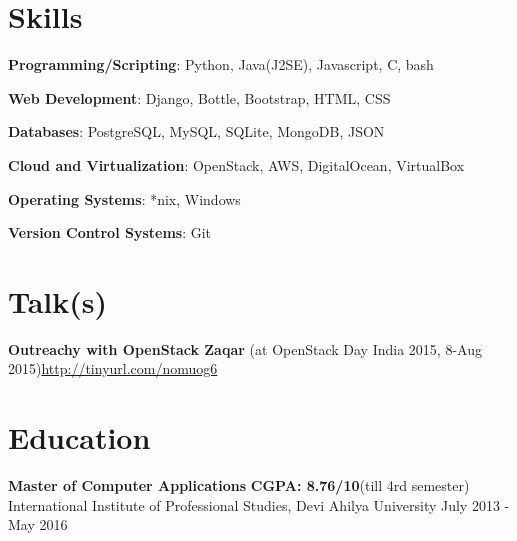 \documentclass[margin,line]{resume}
\begin{document}
\begin{resume}
\begin{list2}
	\end{list2}

    \section{\mysidestyle Skills} 

    \begin{list2}
	\item \textbf{Programming/Scripting}: \hspace{3mm} Python, Java(J2SE), Javascript, C, bash
	\item \textbf{Web Development}: \hspace{13mm}  Django, Bottle, Bootstrap, HTML, CSS
	\item \textbf{Databases}: \hspace{28mm} PostgreSQL, MySQL, SQLite,	MongoDB, JSON
	\item \textbf{Cloud and Virtualization}: \hspace{1mm} OpenStack, AWS, DigitalOcean, VirtualBox
	\item \textbf{Operating Systems}: \hspace{12mm} *nix, Windows
    \item \textbf{Version Control Systems}: \hspace{2mm} Git
	\end{list2}

    \section{\mysidestyle Talk(s)}
    \begin{list2}
    \item \textbf{Outreachy with OpenStack Zaqar} (at OpenStack Day India 2015, 8-Aug 2015)\url{http://tinyurl.com/nomuog6}
    \end{list2}

    \section{\mysidestyle Education}

    \begin{list2}
	\item \textbf{Master of Computer Applications} \hspace{47mm} \textbf{CGPA: 8.76/10}(till 4rd semester) \\ International Institute of Professional Studies, Devi Ahilya University \hspace{17mm} July 2013 - May 2016
	\end{list2}


\end{resume}
\end{document}
